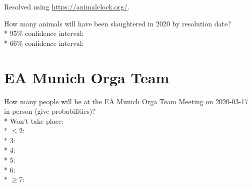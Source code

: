 \documentclass{article}
\begin{document}
Resolved using \href{https://animalclock.org/}{https://animalclock.org/}.

\vspace{0.3cm}

How many animals will have been slaughtered in 2020 by resolution date?\\*
95\% confidence interval: \null\hfill\underline{\hspace{8cm}}\\*
66\% confidence interval: \null\hfill\underline{\hspace{8cm}}

\section*{EA Munich Orga Team}

How many people will be at the EA Munich Orga Team Meeting on 2020-03-17
in person (give probabilities)?\\*
Won't take place: \null\hfill\underline{\hspace{5cm}}\\*
$\le 2$: \null\hfill\underline{\hspace{5cm}}\\*
$3$: \null\hfill\underline{\hspace{5cm}}\\*
$4$: \null\hfill\underline{\hspace{5cm}}\\*
$5$: \null\hfill\underline{\hspace{5cm}}\\*
$6$: \null\hfill\underline{\hspace{5cm}}\\*
$\ge 7$: \null\hfill\underline{\hspace{5cm}}
\end{document}
